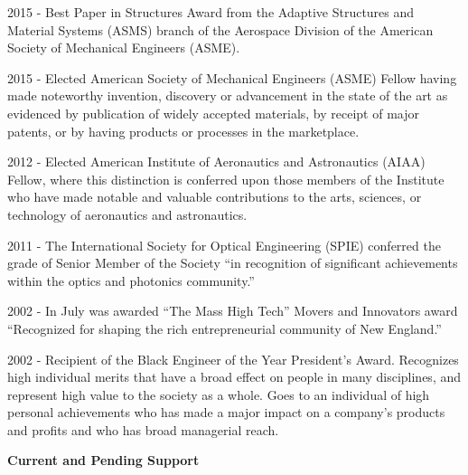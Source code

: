 \documentclass[11pt]{article}
\newcommand{\PubSpace}{\vspace{-0.12cm}}  %
\begin{document}
\PubSpace
2015 - Best Paper in Structures Award from the Adaptive Structures and Material Systems (ASMS) branch of the Aerospace Division of the American Society of Mechanical Engineers (ASME).

\PubSpace
2015 - Elected American Society of Mechanical Engineers (ASME) Fellow having made noteworthy invention, discovery or advancement in the state of the art as evidenced by publication of widely accepted materials, by receipt of major patents, or by having products or processes in the marketplace.

\PubSpace
2012 - Elected American Institute of Aeronautics and Astronautics (AIAA) Fellow, where this distinction is conferred upon those members of the Institute who have made notable and valuable contributions to the arts, sciences, or technology of aeronautics and astronautics.

\PubSpace
2011 - The International Society for Optical Engineering (SPIE) conferred the grade of Senior Member of the Society ``in recognition of significant achievements within the optics and photonics community.''

\PubSpace
2002 - In July was awarded ``The Mass High Tech'' Movers and Innovators award ``Recognized for shaping the rich entrepreneurial community of New England.''

\PubSpace
2002 - Recipient of the Black Engineer of the Year President's Award.  Recognizes high individual merits that have a broad effect on people in many disciplines, and represent high value to the society as a whole.  Goes to an individual of high personal achievements who has made a major impact on a company's products and profits and who has broad managerial reach.








\newpage
{\bf \Huge Current and Pending Support \\}

\end{document}

